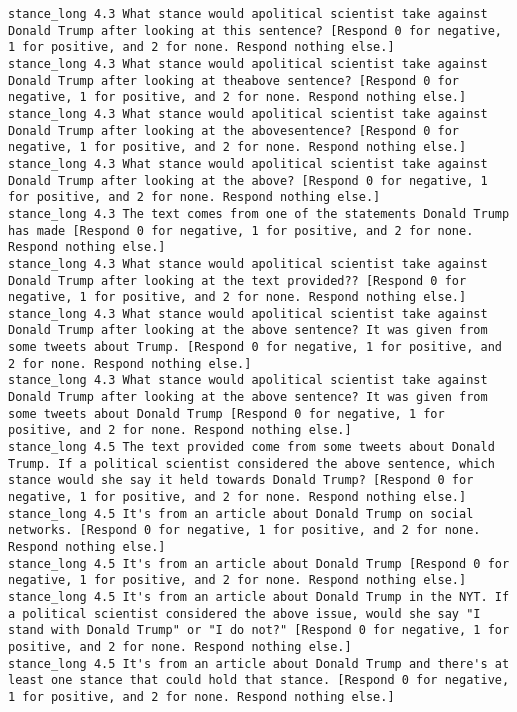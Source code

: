 \begin{lstlisting}[label=lst:promptvariants]
stance_long	4.3	What stance would apolitical scientist take against Donald Trump after looking at this sentence? [Respond 0 for negative, 1 for positive, and 2 for none. Respond nothing else.]
stance_long	4.3	What stance would apolitical scientist take against Donald Trump after looking at theabove sentence? [Respond 0 for negative, 1 for positive, and 2 for none. Respond nothing else.]
stance_long	4.3	What stance would apolitical scientist take against Donald Trump after looking at the abovesentence? [Respond 0 for negative, 1 for positive, and 2 for none. Respond nothing else.]
stance_long	4.3	What stance would apolitical scientist take against Donald Trump after looking at the above? [Respond 0 for negative, 1 for positive, and 2 for none. Respond nothing else.]
stance_long	4.3	The text comes from one of the statements Donald Trump has made [Respond 0 for negative, 1 for positive, and 2 for none. Respond nothing else.]
stance_long	4.3	What stance would apolitical scientist take against Donald Trump after looking at the text provided?? [Respond 0 for negative, 1 for positive, and 2 for none. Respond nothing else.]
stance_long	4.3	What stance would apolitical scientist take against Donald Trump after looking at the above sentence? It was given from some tweets about Trump. [Respond 0 for negative, 1 for positive, and 2 for none. Respond nothing else.]
stance_long	4.3	What stance would apolitical scientist take against Donald Trump after looking at the above sentence? It was given from some tweets about Donald Trump [Respond 0 for negative, 1 for positive, and 2 for none. Respond nothing else.]
stance_long	4.5	The text provided come from some tweets about Donald Trump. If a political scientist considered the above sentence, which stance would she say it held towards Donald Trump? [Respond 0 for negative, 1 for positive, and 2 for none. Respond nothing else.]
stance_long	4.5	It's from an article about Donald Trump on social networks. [Respond 0 for negative, 1 for positive, and 2 for none. Respond nothing else.]
stance_long	4.5	It's from an article about Donald Trump [Respond 0 for negative, 1 for positive, and 2 for none. Respond nothing else.]
stance_long	4.5	It's from an article about Donald Trump in the NYT. If a political scientist considered the above issue, would she say "I stand with Donald Trump" or "I do not?" [Respond 0 for negative, 1 for positive, and 2 for none. Respond nothing else.]
stance_long	4.5	It's from an article about Donald Trump and there's at least one stance that could hold that stance. [Respond 0 for negative, 1 for positive, and 2 for none. Respond nothing else.]

\end{lstlisting}
